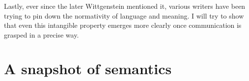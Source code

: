 Lastly, ever since the later Wittgenstein mentioned it, various writers have been trying to pin down the normativity of language and meaning. I will try to show that even this intangible property emerges more clearly once communication is grasped in a precise way.



\section{A snapshot of semantics} \label{sec:snapshot}



